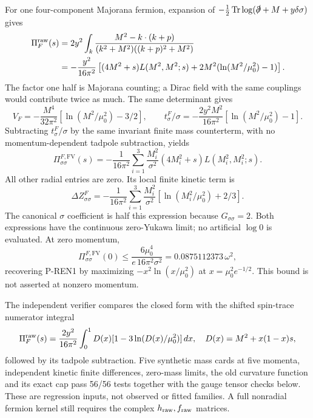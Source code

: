 \documentclass[11pt]{article}
\newcommand{\Tr}{\operatorname{Tr}}
\begin{document}
For one four-component Majorana fermion, expansion of
$-\tfrac12\Tr\log(\slashed\partial+M+y\delta\sigma)$ gives
\begin{align}
 \Pi_F^{\rm raw}(s)&=2y^2\int_k
 \frac{M^2-k\cdot(k+p)}{(k^2+M^2)((k+p)^2+M^2)}\\
 &=-\frac{y^2}{16\pi^2}\left[
 (4M^2+s)L(M^2,M^2;s)+2M^2(\ln(M^2/\mu_0^2)-1)\right].
\end{align}
The factor one half is Majorana counting; a Dirac field with the same
couplings would contribute twice as much. The same determinant gives
\begin{equation}
 V_F=-\frac{M^4}{32\pi^2}[\ln(M^2/\mu_0^2)-3/2],\qquad
 t_\sigma^F/\sigma=-\frac{2y^2M^2}{16\pi^2}[\ln(M^2/\mu_0^2)-1].
\end{equation}
Subtracting $t_\sigma^F/\sigma$ by the same invariant finite mass
counterterm, with no momentum-dependent tadpole subtraction, yields
\begin{equation}
 \boxed{\Pi^{F,\mathrm{FV}}_{\sigma\sigma}(s)=
 -\frac{1}{16\pi^2}\sum_{i=1}^3\frac{M_i^2}{\sigma^2}
 (4M_i^2+s)L(M_i^2,M_i^2;s).}
\end{equation}
All other radial entries are zero. Its local finite kinetic term is
\begin{equation}
 \boxed{\Delta Z^F_{\sigma\sigma}=-\frac{1}{16\pi^2}
 \sum_{i=1}^3\frac{M_i^2}{\sigma^2}
 [\ln(M_i^2/\mu_0^2)+2/3].}
\end{equation}
The canonical $\sigma$ coefficient is half this expression because
$G_{\sigma\sigma}=2$. Both expressions have the continuous zero-Yukawa
limit; no artificial $\log 0$ is evaluated. At zero momentum,
\begin{equation}
 \Pi^{F,\mathrm{FV}}_{\sigma\sigma}(0)
 \le\frac{6\mu_0^4}{e\,16\pi^2\sigma^2}
 =0.0875112373\,\omega^2,
\end{equation}
recovering P-REN1 by maximizing $-x^2\ln(x/\mu_0^2)$ at
$x=\mu_0^2e^{-1/2}$. This bound is not asserted at nonzero momentum.

The independent verifier compares the closed form with the shifted
spin-trace numerator integral
\begin{equation}
 \Pi_F^{\rm raw}(s)=\frac{2y^2}{16\pi^2}\int_0^1
 D(x)[1-3\ln(D(x)/\mu_0^2)]\,dx,\quad D(x)=M^2+x(1-x)s,
\end{equation}
followed by its tadpole subtraction. Five synthetic mass cards at five
momenta, independent kinetic finite differences, zero-mass limits,
the old curvature function and its exact cap pass 56/56 tests together
with the gauge tensor checks below. These are regression inputs,
not observed or fitted families. A full nonradial fermion kernel still
requires the complex $h_{\rm raw},f_{\rm raw}$ matrices.
\end{document}
